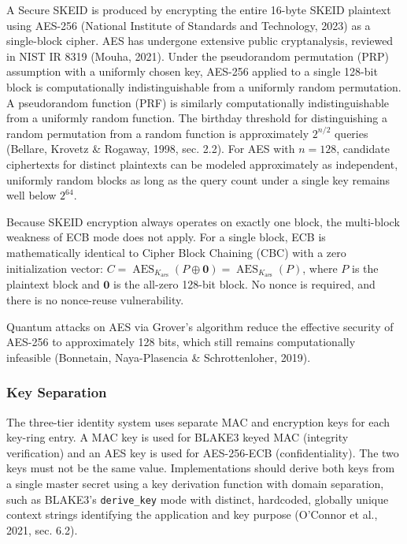 \documentclass[fleqn,10pt,lineno]{wlpeerj}
\begin{document}
A Secure SKEID is produced by encrypting the entire 16-byte SKEID
plaintext using AES-256 (National Institute of Standards and Technology,
2023) as a single-block cipher. AES has undergone extensive public
cryptanalysis, reviewed in NIST IR 8319 (Mouha, 2021). Under the
pseudorandom permutation (PRP) assumption with a uniformly chosen key,
AES-256 applied to a single 128-bit block is computationally
indistinguishable from a uniformly random permutation. A pseudorandom
function (PRF) is similarly computationally indistinguishable from a
uniformly random function. The birthday threshold for distinguishing a
random permutation from a random function is approximately \(2^{n/2}\)
queries (Bellare, Krovetz \& Rogaway, 1998, sec. 2.2). For AES with
\(n = 128\), candidate ciphertexts for distinct plaintexts can be
modeled approximately as independent, uniformly random blocks as long as
the query count under a single key remains well below \(2^{64}\).

Because SKEID encryption always operates on exactly one block, the
multi-block weakness of ECB mode does not apply. For a single block, ECB
is mathematically identical to Cipher Block Chaining (CBC) with a zero
initialization vector:
\(C = \operatorname{AES}_{K_{\mathrm{aes}}}(P \oplus \mathbf{0}) = \operatorname{AES}_{K_{\mathrm{aes}}}(P)\),
where \(P\) is the plaintext block and \(\mathbf{0}\) is the all-zero
128-bit block. No nonce is required, and there is no nonce-reuse
vulnerability.

Quantum attacks on AES via Grover's algorithm reduce the effective
security of AES-256 to approximately 128 bits, which still remains
computationally infeasible (Bonnetain, Naya-Plasencia \& Schrottenloher,
2019).

\subsubsection{Key Separation}\label{key-separation}

The three-tier identity system uses separate MAC and encryption keys for
each key-ring entry. A MAC key is used for BLAKE3 keyed MAC (integrity
verification) and an AES key is used for AES-256-ECB (confidentiality).
The two keys must not be the same value. Implementations should derive
both keys from a single master secret using a key derivation function
with domain separation, such as BLAKE3's \texttt{derive\_key} mode with
distinct, hardcoded, globally unique context strings identifying the
application and key purpose (O'Connor et al., 2021, sec. 6.2).
\end{document}
